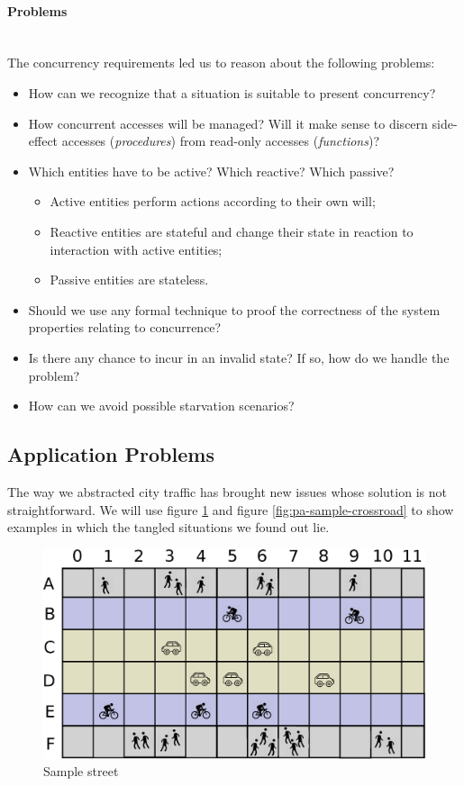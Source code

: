 \paragraph{Problems} \mbox{} \\

The concurrency requirements led us to reason about the following problems:

\begin{itemize}
\item How can we recognize that a situation is suitable to present concurrency?
\item How concurrent accesses will be managed? Will it make sense to discern
  side-effect accesses (\emph{procedures}) from read-only accesses
  (\emph{functions})?
\item Which entities have to be active? Which reactive? Which passive?
  \begin{itemize}
    \item Active entities perform actions according to their own will;
    \item Reactive entities are stateful and change their state in reaction to
      interaction with active entities;
    \item Passive entities are stateless.
  \end{itemize}
\item Should we use any formal technique to proof the correctness
of the system properties relating to concurrence?
\item Is there any chance to incur in an invalid state? If so, how do we
  handle the problem?
\item How can we avoid possible starvation scenarios?
\end{itemize}


\subsection{Application Problems}\label{sec:pa-app-problems}

The way we abstracted city traffic has brought new issues whose solution is not straightforward.
We will use figure \ref{fig:pa-sample-street} and figure
\ref{fig:pa-sample-crossroad} to show examples in which the tangled situations
we found out lie.

\begin{figure}[H]
  \centering
  \includegraphics[width=.7\columnwidth]{images/analysis/street_base.eps}
  \caption{Sample street}
  \label{fig:pa-sample-street}
\end{figure}


